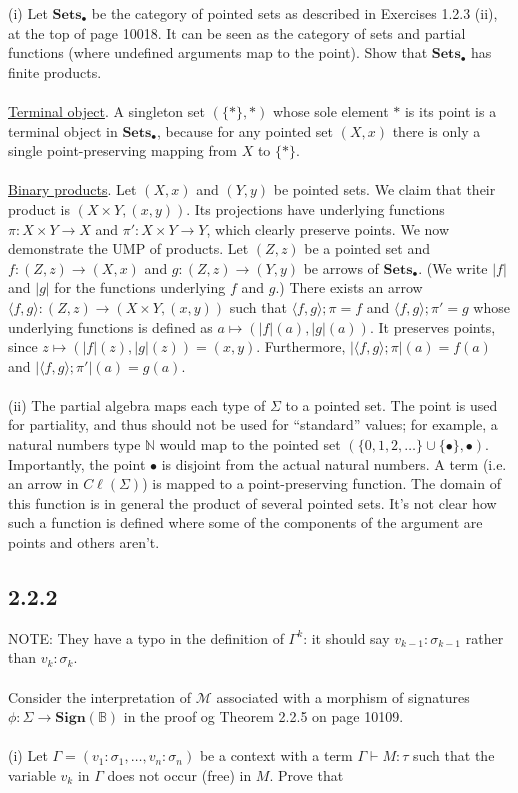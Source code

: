 \documentclass{article}
\newcommand{\mbf}{\mathbf}
\begin{document}
(i) Let $\mbf{Sets}_{\bullet}$ be the category of pointed sets as described in Exercises 1.2.3 (ii), 
at the top of page 10018. 
It can be seen as the category of sets and partial functions (where undefined arguments map to the point). 
Show that $\mbf{Sets}_{\bullet}$ has finite products.\\~\\
\underline{Terminal object}. A singleton set $(\{ \ast \},\ast)$ whose sole element $\ast$ is its point
is a terminal object in $\mbf{Sets}_{\bullet}$, because for any pointed set $(X,x)$ there is only
a single point-preserving mapping from $X$ to $\{ \ast \}$.\\~\\
\underline{Binary products}. Let $(X,x)$ and $(Y,y)$ be pointed sets. We claim that their product
is $(X \times Y, (x,y))$. Its projections have underlying functions $\pi : X \times Y \to X$ 
and $\pi' : X \times Y \to Y$, which clearly preserve points. We now demonstrate the UMP of products.
Let $(Z,z)$ be a pointed set and $f : (Z,z) \to (X,x)$ and $g : (Z,z) \to (Y,y)$ be arrows of $\mbf{Sets}_{\bullet}$.
(We write $|f|$ and $|g|$ for the functions underlying $f$ and $g$.) There exists an arrow 
$\langle f, g \rangle : (Z,z) \to (X \times Y, (x,y))$ such that $\langle f, g \rangle;\pi = f$ and 
$\langle f,g \rangle;\pi' = g$ whose underlying functions is defined as $a \mapsto (|f|(a), |g|(a))$.
It preserves points, since $z \mapsto (|f|(z), |g|(z)) = (x,y)$. Furthermore, $|\langle f, g \rangle;\pi|(a) = 
f(a)$ and $|\langle f,g \rangle;\pi'|(a) = g(a)$.\\~\\
(ii) The partial algebra maps each type of $\Sigma$ to a pointed set. The point is used for partiality, 
and thus should not be used for ``standard'' values; for example, a natural numbers type $\mathbb N$
would map to the pointed set $(\{ 0,1,2,\ldots \} \cup \{ \bullet \}, \bullet)$. Importantly, 
the point $\bullet$ is disjoint from the actual natural numbers. A term (i.e. an arrow in $C \ell(\Sigma)$)
is mapped to a point-preserving function. The domain of this function is in general
the product of several pointed sets. It's not clear how such a function is defined where some of the components
of the argument are points and others aren't.

\subsection*{2.2.2}

NOTE: They have a typo in the definition of $\Gamma^k$: it should say $v_{k-1} : \sigma_{k-1}$ rather than $v_k : \sigma_k$.\\~\\
Consider the interpretation of $\mathcal M$ associated with a morphism of signatures $\phi : \Sigma \to \mbf{Sign}(\mathbb B)$
in the proof og Theorem 2.2.5 on page 10109. \\~\\
(i) Let $\Gamma = (v_1 : \sigma_1, \ldots, v_n : \sigma_n)$ be a context with a term $\Gamma \vdash M : \tau$ such that
the variable $v_k$ in $\Gamma$ does not occur (free) in $M$. Prove that 
\end{document}
